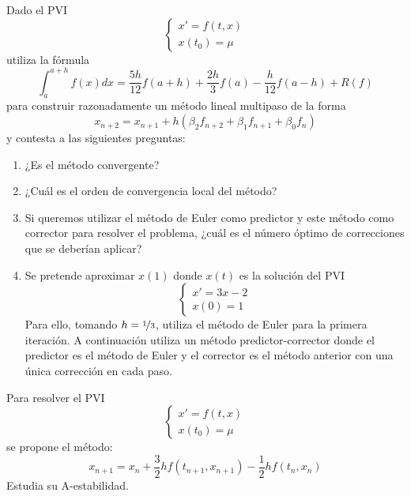 \begin{ejercicio}
    Dado el PVI
    \begin{equation*}
        \begin{cases}
            x' = f(t, x) \\
            x(t_0) = \mu
        \end{cases}
    \end{equation*}
    utiliza la fórmula
    \begin{equation*}
        \int_a^{a+h} f(x)dx = \frac{5h}{12} f(a + h) + \frac{2h}{3} f(a) - \frac{h}{12} f(a - h) + R(f)
    \end{equation*}
    para construir razonadamente un método lineal multipaso de la forma
    \begin{equation*}
        x_{n+2} = x_{n+1} + h(\beta_2 f_{n+2} + \beta_1 f_{n+1} + \beta_0 f_n)
    \end{equation*}
    y contesta a las siguientes preguntas:
    \begin{enumerate}
        \item ¿Es el método convergente?
        \item ¿Cuál es el orden de convergencia local del método?
        \item Si queremos utilizar el método de Euler como predictor y este método como corrector para resolver el problema, ¿cuál es el número óptimo de correcciones que se deberían aplicar?
        \item Se pretende aproximar $x(1)$ donde $x(t)$ es la solución del PVI
            \begin{equation*}
                \begin{cases}
                    x' = 3x - 2 \\
                    x(0) = 1
                \end{cases}
            \end{equation*}
            Para ello, tomando $h = \nicefrac{1}{3}$, utiliza el método de Euler para la primera iteración. A continuación utiliza un método predictor-corrector donde el predictor es el método de Euler y el corrector es el método anterior con una única corrección en cada paso.
    \end{enumerate}
\end{ejercicio}

\begin{ejercicio}
    Para resolver el PVI
    \begin{equation*}
        \begin{cases}
            x' = f(t, x) \\
            x(t_0) = \mu
        \end{cases}
    \end{equation*}
    se propone el método:
    \begin{equation*}
        x_{n+1} = x_n + \frac{3}{2} h f(t_{n+1}, x_{n+1}) - \frac{1}{2} h f(t_n, x_n)
    \end{equation*}
    Estudia su A-estabilidad.
\end{ejercicio}

